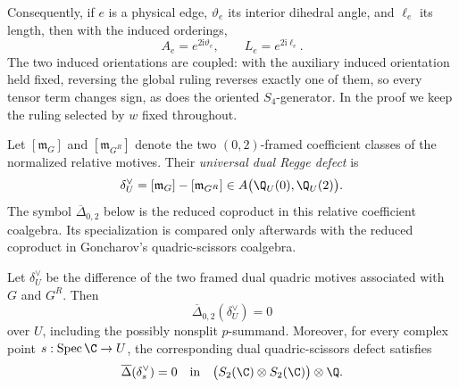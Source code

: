 Consequently, if \(e\) is a physical edge, \(\vartheta_e\) its interior
dihedral angle, and \(\ell_e\) its length, then with the induced orderings,
\begin{equation}
 A_e=e^{2\mathrm i\vartheta_e},
 \qquad
 L_e=e^{2\mathrm i\ell_e}.
 \label{cp:eq-cross-ratio-phases}
\end{equation}
The two induced orientations are coupled: with the auxiliary induced
orientation held fixed, reversing the global ruling reverses exactly one of
them, so every tensor term changes sign, as does the oriented
\(S_4\)-generator.  In the proof we keep the ruling selected by \(w\) fixed
throughout.

Let \([\mathfrak m_G]\) and \([\mathfrak m_{G^R}]\) denote the two
\((0,2)\)-framed coefficient classes of the normalized relative motives.
Their \emph{universal dual Regge defect} is
\[
 \delta_U^\vee=[\mathfrak m_G]-[\mathfrak m_{G^R}]
 \in A\bigl(\Q_U(0),\Q_U(2)\bigr).
\]
The symbol \(\overline\Delta_{0,2}\) below is the reduced coproduct in this
relative coefficient coalgebra.  Its specialization is compared only
afterwards with the reduced coproduct in Goncharov's quadric-scissors
coalgebra.

\begin{lemma}
\label{cp:lem-coproduct-zero}
Let \(\delta_U^\vee\) be the difference of the two framed dual quadric
motives associated with \(G\) and \(G^R\).  Then
\[
 \overline\Delta_{0,2}(\delta_U^\vee)=0
\]
over \(U\), including the possibly nonsplit \(p\)-summand.
Moreover, for every complex point \(s:\Spec\C\to U\), the corresponding
dual quadric-scissors defect satisfies
\[
 \overline\Delta(\delta_s^\vee)=0
 \quad\text{in}\quad
 \bigl(S_2(\C)\otimes S_2(\C)\bigr)\otimes\Q.
\]
\end{lemma}


